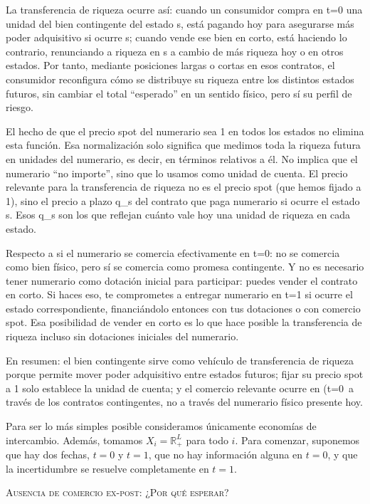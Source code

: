 \documentclass[10pt,a4paper]{article}
\begin{document}
La transferencia de riqueza ocurre así: cuando un consumidor compra en t=0 una unidad del bien contingente del estado s, está pagando hoy para asegurarse más poder adquisitivo si ocurre s; cuando vende ese bien en corto, está haciendo lo contrario, renunciando a riqueza en s a cambio de más riqueza hoy o en otros estados. Por tanto, mediante posiciones largas o cortas en esos contratos, el consumidor reconfigura cómo se distribuye su riqueza entre los distintos estados futuros, sin cambiar el total “esperado” en un sentido físico, pero sí su perfil de riesgo.

El hecho de que el precio spot del numerario sea 1 en todos los estados no elimina esta función. Esa normalización solo significa que medimos toda la riqueza futura en unidades del numerario, es decir, en términos relativos a él. No implica que el numerario “no importe”, sino que lo usamos como unidad de cuenta. El precio relevante para la transferencia de riqueza no es el precio spot (que hemos fijado a 1), sino el precio a plazo q_s del contrato que paga numerario si ocurre el estado s. Esos q_s son los que reflejan cuánto vale hoy una unidad de riqueza en cada estado.

Respecto a si el numerario se comercia efectivamente en t=0: no se comercia como bien físico, pero sí se comercia como promesa contingente. Y no es necesario tener numerario como dotación inicial para participar: puedes vender el contrato en corto. Si haces eso, te comprometes a entregar numerario en t=1 si ocurre el estado correspondiente, financiándolo entonces con tus dotaciones o con comercio spot. Esa posibilidad de vender en corto es lo que hace posible la transferencia de riqueza incluso sin dotaciones iniciales del numerario.

En resumen: el bien contingente sirve como vehículo de transferencia de riqueza porque permite mover poder adquisitivo entre estados futuros; fijar su precio spot a 1 solo establece la unidad de cuenta; y el comercio relevante ocurre en (t=0\ a través de los contratos contingentes, no a través del numerario físico presente hoy.

Para ser lo más simples posible consideramos únicamente economías de intercambio. Además, tomamos $X_i=\mathbb{R}^L_+$ para todo $i$. Para comenzar, suponemos que hay dos fechas, $t=0$ y $t=1$, que no hay información alguna en $t=0$, y que la incertidumbre se resuelve completamente en $t=1$. 

\textsc{Ausencia de comercio ex-post: ¿Por qué esperar?}
\end{document}

